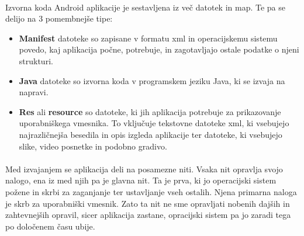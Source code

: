 \paragraph{}Izvorna koda Android aplikacije je sestavljena iz več datotek in map. Te pa se delijo na 3 pomembnejše tipe:
\begin{itemize}
  \item {\bf Manifest} datoteke so zapisane v formatu xml in operacijskemu sistemu povedo, kaj aplikacija počne, potrebuje, in zagotavljajo ostale podatke o njeni strukturi.
  \item {\bf Java} datoteke so izvorna koda v programskem jeziku Java, ki se izvaja na napravi.
  \item {\bf Res} ali {\bf resource} so datoteke, ki jih aplikacija potrebuje za prikazovanje uporabniškega vmesnika. To vključuje tekstovne datoteke xml, ki vsebujejo najrazličnejša besedila in opis izgleda aplikacije ter datoteke, ki vsebujejo slike, video posnetke in podobno gradivo.
\end{itemize}

\paragraph{}Med izvajanjem se aplikacija deli na posamezne niti. Vsaka nit opravlja svojo nalogo, ena iz med njih pa je glavna nit. Ta je prva, ki jo operacijski sistem požene in skrbi za zaganjanje ter ustavljanje vseh ostalih. Njena primarna naloga je skrb za uporabniški vmesnik. Zato ta nit ne sme opravljati nobenih dajših in zahtevnejših opravil, sicer aplikacija zastane, opracijski sistem pa jo zaradi tega po določenem času ubije.
